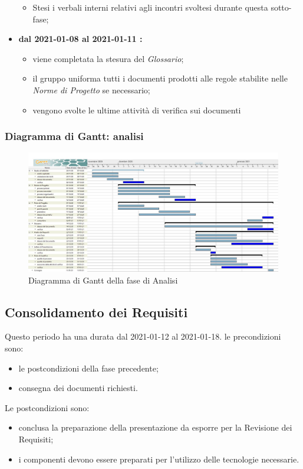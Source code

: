\begin{itemize}
\begin{itemize}
		\item Stesi i verbali interni relativi agli incontri svoltesi durante questa sotto-fase;
	\end{itemize}
	\item \textbf{dal 2021-01-08 al 2021-01-11 :}
	\begin{itemize}
		\item viene completata la stesura del \textit{Glossario};
		\item il gruppo uniforma tutti i documenti prodotti alle regole stabilite nelle \textit{Norme di Progetto} se necessario;
		\item vengono svolte le ultime attività di verifica sui documenti
	\end{itemize}
\end{itemize}

\subsubsection{Diagramma di Gantt: analisi}
\begin{figure}[H]
    \centering
    \includegraphics[scale = 0.25]{components/img/Analisi.jpg}
    \caption{Diagramma di Gantt della fase di Analisi}
    \label{fig:Diagramma}
\end{figure}

\newpage
\subsection{Consolidamento dei Requisiti}
Questo periodo ha una durata dal 2021-01-12 al 2021-01-18.
le precondizioni sono:
\begin{itemize}
	\item le postcondizioni della fase precedente;
	\item consegna dei documenti richiesti.
\end{itemize}
Le postcondizioni sono:
\begin{itemize}
	\item conclusa la preparazione della presentazione da esporre per la Revisione dei Requisiti;
	\item i componenti devono essere preparati per l'utilizzo delle tecnologie necessarie.
\end{itemize}
